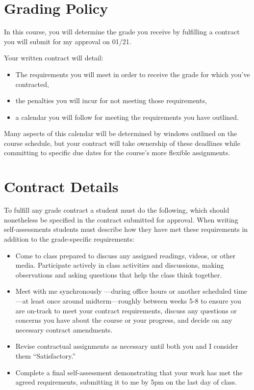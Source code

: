 \hypertarget{grading-policy-3}{%
\section*{Grading Policy}\label{grading-policy-3}}


In this course, you will determine the grade you receive by fulfilling a contract you will submit for my approval on 01/21.

Your written contract will detail:

\begin{itemize}
\item
  The requirements you will meet in order to receive the grade for which you've contracted,
\item
  the penalties you will incur for not meeting those requirements,
\item
  a calendar you will follow for meeting the requirements you have outlined.
\end{itemize}

Many aspects of this calendar will be determined by windows outlined on the course schedule, but your contract will take ownership of these deadlines while committing to specific due dates for the course's more flexible assignments.

\hypertarget{contract-details}{%
\section*{Contract Details}\label{contract-details}}


To fulfill any grade contract a student must do the following, which should nonetheless be specified in the contract submitted for approval. When writing self-assessments students must describe how they have met these requirements in addition to the grade-specific requirements:

\begin{itemize}
\item
  Come to class prepared to discuss any assigned readings, videos, or other media. Participate actively in class activities and discussions, making observations and asking questions that help the class think together.
\item
  Meet with me synchronously ---during office hours or another scheduled time---at least once around midterm---roughly between weeks 5-8 to ensure you are on-track to meet your contract requirements, discuss any questions or concerns you have about the course or your progress, and decide on any necessary contract amendments.
\item
  Revise contractual assignments as necessary until both you and I consider them ``Satisfactory.''
\item
  Complete a final self-assessment demonstrating that your work has met the agreed requirements, submitting it to me by 5pm on the last day of class.
\end{itemize}

